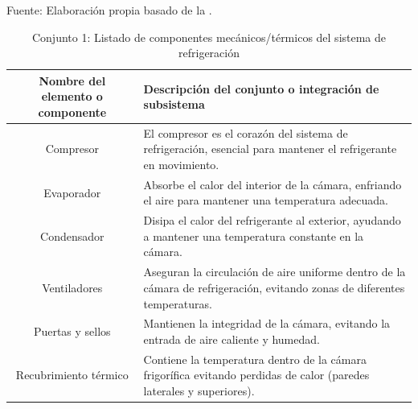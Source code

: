 \begin{table}[H]
	\centering
	\caption{Conjunto 1: Listado de componentes mecánicos/térmicos del sistema de refrigeración}
	Fuente: Elaboración propia basado de la .
		\begin{tabular}{@{}cl@{}}
	\toprule
	\begin{minipage}[t]{0.25\linewidth}\textbf{Nombre del elemento o componente}\end{minipage} & \begin{minipage}[t]{0.7\linewidth}\textbf{Descripción del conjunto o integración de subsistema}\end{minipage} \\
		
		 \midrule
		 Compresor                                 & \begin{minipage}[t]{0.7\linewidth}El compresor es el corazón del sistema de refrigeración, esencial para mantener el refrigerante en movimiento.\end{minipage} \\
		 Evaporador                                & \begin{minipage}[t]{0.7\linewidth}Absorbe el calor del interior de la cámara, enfriando el aire para mantener una temperatura adecuada.\end{minipage} \\
		Condensador                               & \begin{minipage}[t]{0.7\linewidth}Disipa el calor del refrigerante al exterior, ayudando a mantener una temperatura constante en la cámara.\end{minipage} \\
		Ventiladores                              & \begin{minipage}[t]{0.7\linewidth}Aseguran la circulación de aire uniforme dentro de la cámara de refrigeración, evitando zonas de diferentes temperaturas.\end{minipage} \\
		 Puertas y sellos                          & \begin{minipage}[t]{0.7\linewidth}Mantienen la integridad de la cámara, evitando la entrada de aire caliente y humedad.\end{minipage} \\
		 
		 Recubrimiento térmico              
		 	 
		 	 
		 	      & \begin{minipage}[t]{0.7\linewidth}
		  	Contiene la temperatura  	dentro de la cámara 		  	frigorífica evitando perdidas 		  	de calor (paredes laterales y superiores).
		  	\end{minipage} \\
		 
		  
		  \bottomrule
	\end{tabular}
	\label{tabla:mecanicos}
	
	\end{table}
	
